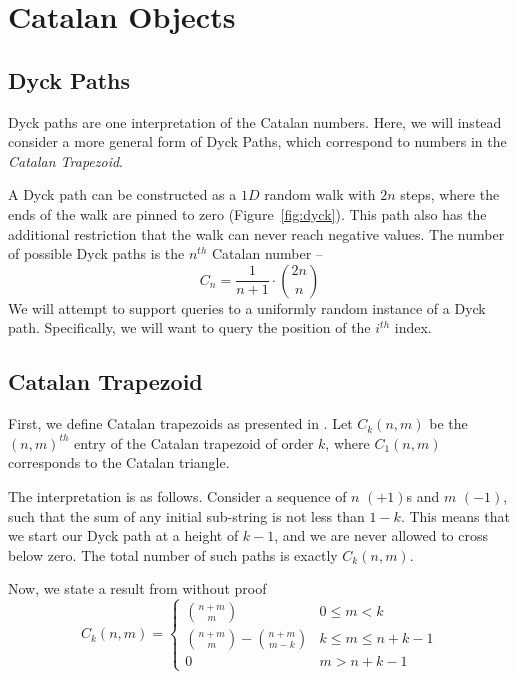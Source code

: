 \section{Catalan Objects}%
\label{sec:catalan_objects}


\subsection{Dyck Paths}
\label{sub:dyck_paths}


Dyck paths are one interpretation of the Catalan numbers.
Here, we will instead consider a more general form of Dyck Paths, which correspond to numbers in the \textit{Catalan Trapezoid}.

A Dyck path can be constructed as a $1D$ random walk with $2n$ steps,
where the ends of the walk are pinned to zero (Figure~\ref{fig:dyck}).
This path also has the additional restriction that the walk can never reach negative values.
The number of possible Dyck paths is the $n^{th}$ Catalan number --
$$C_n = \frac{1}{n+1}\cdot {2n\choose n}$$
We will attempt to support queries to a uniformly random instance of a Dyck path.
Specifically, we will want to query the position of the $i^{th}$ index.

\subsection{Catalan Trapezoid}
First, we define Catalan trapezoids as presented in \cite{trap}.
Let $C_k(n,m)$ be the $(n,m)^{th}$ entry of the Catalan trapezoid of order $k$, where $C_1(n,m)$ corresponds to the Catalan triangle.

The interpretation is as follows. Consider a sequence of $n$ $(+1)$s and $m$ $(-1)$,
such that the sum of any initial sub-string is not less than $1-k$.
This means that we start our Dyck path at a height of $k-1$, and we are never allowed to cross below zero.
The total number of such paths is exactly $C_k(n,m)$.

Now, we state a result from \cite{trap} without proof
$$
C_k(n,m)=
\begin{cases}
{n+m}\choose m &0\le m<k\\
{{n+m}\choose{m}} - {{n+m}\choose{m-k}} &k\le m\le n+k-1\\
0 &m>n+k-1
\end{cases}
$$
